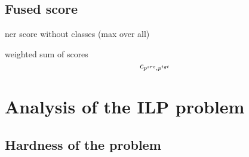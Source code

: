 \subsection{Fused score}

ner score without classes (max over all)

weighted sum of scores
\begin{equation} \label{eq:fused_cost}
    c_{p^{src}, p^{tgt}}
\end{equation}

\section{Analysis of the ILP problem}

\subsection{Hardness of the problem}
